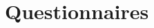 \documentclass[msc, eng]{ita}    %
\begin{document}
\renewcommand\bibname{References} %
%


\appendix
\chapter{Questionnaires}
\label{ap:questionnaires}


%

%

%

%

%


%

%

%
\end{document}
